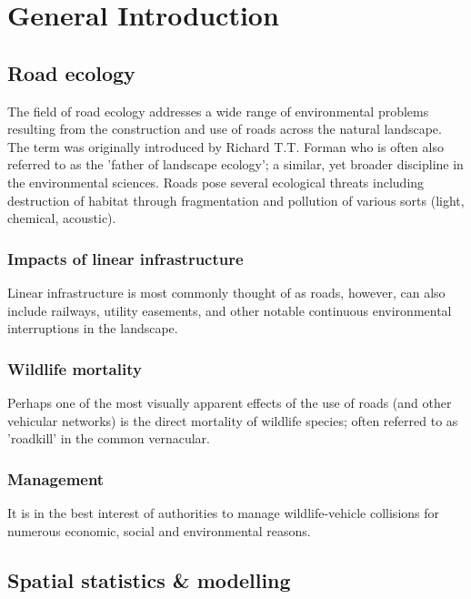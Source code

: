 \chapter{General Introduction}\label{sec:intro}
\newpage

\section{Road ecology}

The field of road ecology addresses a wide range of environmental problems resulting from the construction and use of roads across the natural landscape.  The term was originally introduced by Richard T.T. Forman who is often also referred to as the 'father of landscape ecology'; a similar, yet broader discipline in the environmental sciences. Roads pose several ecological threats including destruction of habitat through fragmentation and pollution of various sorts (light, chemical, acoustic).

\subsection{Impacts of linear infrastructure}

Linear infrastructure is most commonly thought of as roads, however, can also include railways, utility easements, and other notable continuous environmental interruptions in the landscape.

\subsection{Wildlife mortality}

Perhaps one of the most visually apparent effects of the use of roads (and other vehicular networks) is the direct mortality of wildlife species; often referred to as 'roadkill' in the common vernacular. 

\subsection{Management}

It is in the best interest of authorities to manage wildlife-vehicle collisions for numerous economic, social and environmental reasons.

\section{Spatial statistics \& modelling}

